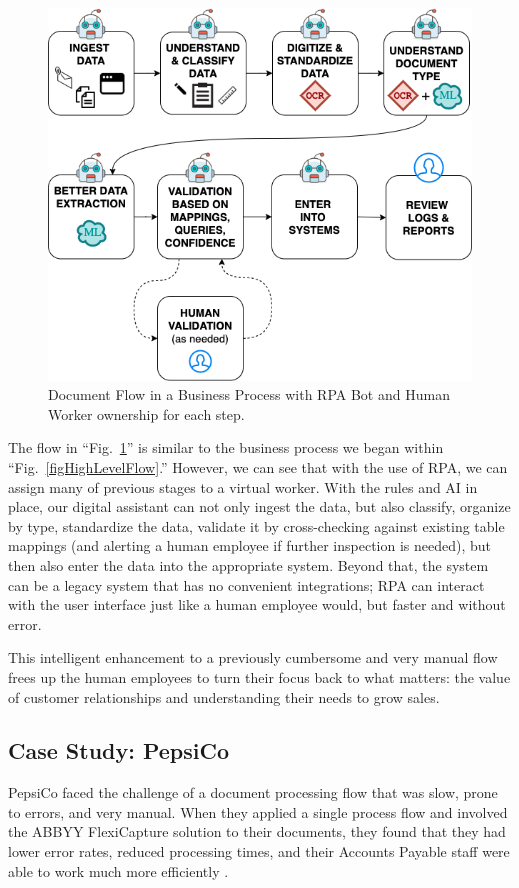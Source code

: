 \documentclass[conference]{IEEEtran}
\begin{document}
\begin{figure}[ht]
\centerline{\includegraphics[width=\columnwidth]{BotFlow.png}}
\caption{Document Flow in a Business Process with RPA Bot and Human Worker ownership for each step.}
\label{figBotFlow}
\end{figure}

The flow in ``Fig.~\ref{figBotFlow}'' is similar to the business process we began within ``Fig.~\ref{figHighLevelFlow}.'' However, we can see that with the use of RPA, we can assign many of previous stages to a virtual worker. With the rules and AI in place, our digital assistant can not only ingest the data, but also classify, organize by type, standardize the data, validate it by cross-checking against existing table mappings (and alerting a human employee if further inspection is needed), but then also enter the data into the appropriate system. Beyond that, the system can be a legacy system that has no convenient integrations; RPA can interact with the user interface just like a human employee would, but faster and without error.

This intelligent enhancement to a previously cumbersome and very manual flow frees up the human employees to turn their focus back to what matters: the value of customer relationships and understanding their needs to grow sales.

\subsection{Case Study: PepsiCo}
PepsiCo faced the challenge of a document processing flow that was slow, prone to errors, and very manual. When they applied a single process flow and involved the ABBYY FlexiCapture solution to their documents, they found that they had lower error rates, reduced processing times, and their Accounts Payable staff were able to work much more efficiently \cite{pepsico}.
\end{document}
